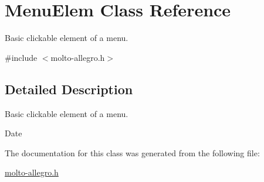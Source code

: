 \hypertarget{classMenuElem}{\section{Menu\-Elem Class Reference}
\label{classMenuElem}
}


Basic clickable element of a menu.  




{\ttfamily \#include $<$molto-\/allegro.\-h$>$}



\subsection{Detailed Description}
Basic clickable element of a menu. 

\begin{DoxyDate}{Date}

\end{DoxyDate}


The documentation for this class was generated from the following file\-:\begin{DoxyCompactItemize}
\item 
\hyperlink{molto-allegro_8h}{molto-\/allegro.\-h}\end{DoxyCompactItemize}
